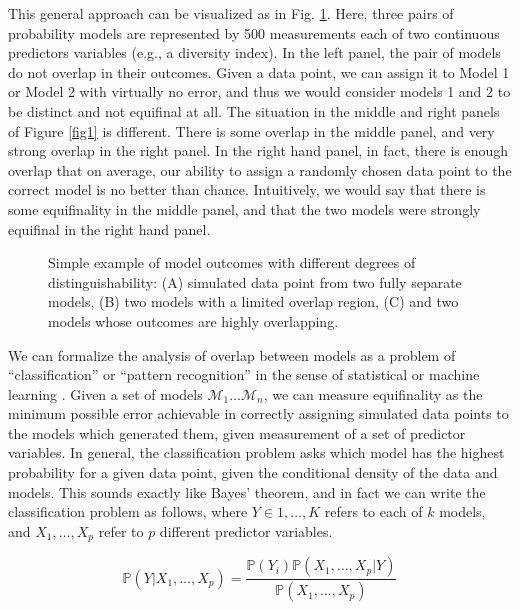 This general approach can be visualized as in Fig.
\ref{fig2}. Here, three pairs of probability models
are represented by 500 measurements each of two continuous predictors variables (e.g., a diversity index).
In the left panel, the pair of models do not overlap in their outcomes.
Given a data point, we can assign it to Model 1 or Model 2 with
virtually no error, and thus we would consider models 1 and 2 to be
distinct and not equifinal at all. The situation in the middle and right
panels of Figure \ref{fig1} is different. There is
some overlap in the middle panel, and very strong overlap in the right
panel. In the right hand panel, in fact, there is enough overlap that on
average, our ability to assign a randomly chosen data point to the
correct model is no better than chance. Intuitively, we would say that
there is some equifinality in the middle panel, and that the two models
were strongly equifinal in the right hand panel.

\begin{figure}[h]
\caption{Simple example of model outcomes with different degrees of distinguishability: (A) simulated data point from two fully separate models, (B) two models with a limited overlap region, (C) and two models whose outcomes are highly overlapping.}
\label{fig2}
\end{figure}


We can formalize the analysis of overlap between models as a problem of
``classification'' or ``pattern recognition'' in the sense of
statistical or machine learning \cite{hastie2009elements}. Given a set
of models \(\mathcal{M}_1 \ldots \mathcal{M}_n\), we can measure
equifinality as the minimum possible error achievable in correctly
assigning simulated data points to the models which generated them,
given measurement of a set of predictor variables. In general, the
classification problem asks which model has the highest probability for
a given data point, given the conditional density of the data and
models. This sounds exactly like Bayes' theorem, and in fact we can
write the classification problem as follows, where
\(Y \in 1, \ldots, K\) refers to each of \(k\) models, and
\(X_1, \ldots, X_p\) refer to \(p\) different predictor variables.

\begin{equation}
\mathbb{P}(Y | X_1, \ldots, X_p) = \frac{\mathbb{P}(Y_i) \mathbb{P}(X_1, \ldots, X_p | Y)}{\mathbb{P}(X_1, \ldots, X_p)}
\label{eq:bayes-rule-classification}
\end{equation}

